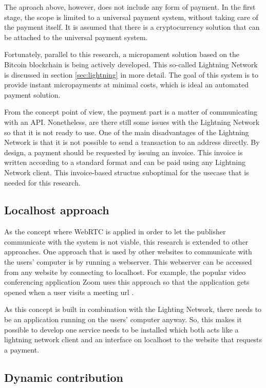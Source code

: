 The aproach above, however, does not include any form of payment. In the first stage, the scope is limited to a universal payment system, without taking care of the payment itself. It is assumed that there is a cryptocurrency solution that can be attached to the universal payment system.

Fortunately, parallel to this research, a micropament solution based on the Bitcoin blockchain is being actively developed. This so-called Lightning Network is discussed in section \ref{sec:lightning} in more detail. The goal of this system is to provide instant micropayments at minimal costs, which is ideal an automated payment solution.

From the concept point of view, the payment part is a matter of communicating with an API. Nonetheless, are there still some issues with the Lightning Network so that it is not ready to use. One of the main disadvantages of the Lightning Network is that it is not possible to send a transaction to an address directly. By design, a payment should be requested by issuing an invoice. This invoice is written according to a standard format and can be paid using any Lightning Network client. This invoice-based structue suboptimal for the usecase that is needed for this research.

\subsection{Localhost approach}

As the concept where WebRTC is applied in order to let the publisher communicate with the system is not viable, this research is extended to other approaches. One approach that is used by other websites to communicate with the users' computer is by running a webserver. This webserver can be accessed from any website by connecting to localhost. For example, the popular video conferencing application Zoom uses this approach so that the application gets opened when a user visits a meeting url \cite{zoomwebserver}.

As this concept is built in combination with the Lighting Network, there needs to be an application running on the users' computer anyway. So, this makes it possible to develop one service needs to be installed which both acts like a lightning network client and an interface on localhost to the website that requests a payment.

\subsection{Dynamic contribution}

